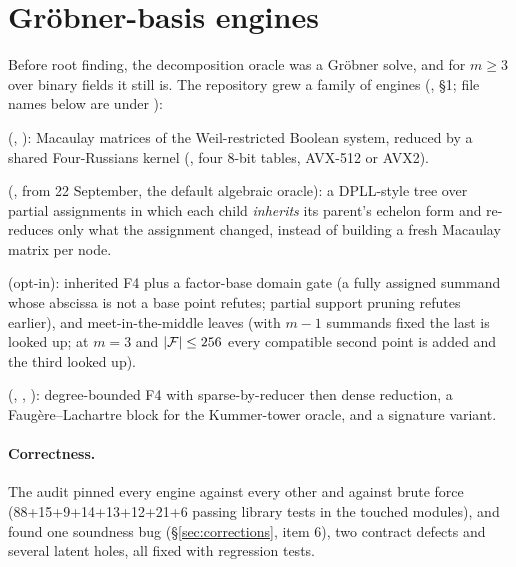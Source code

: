 \section{Gr\"obner-basis engines}\label{sec:groebner}

Before root finding, the decomposition oracle was a Gr\"obner solve, and
for $m\ge3$ over binary fields it still is. The repository grew a family
of engines (, \S1; file names below are under ):

\begin{description}[style=nextline, leftmargin=1.4em]
\item[Matrix F4 and F5 over $\FF_2$] (,
  ): Macaulay matrices of the Weil-restricted Boolean
  system, reduced by a shared Four-Russians kernel (, four
  8-bit tables, AVX-512 or AVX2).
\item[Inherited F4] (, from 22 September, the
  default algebraic oracle): a DPLL-style tree over partial assignments in
  which each child \emph{inherits} its parent's echelon form and re-reduces
  only what the assignment changed, instead of building a fresh Macaulay
  matrix per node.
\item[F6-IC] (opt-in): inherited F4 plus a factor-base domain gate (a
  fully assigned summand whose abscissa is not a base point refutes;
  partial support pruning refutes earlier), and meet-in-the-middle leaves
  (with $m-1$ summands fixed the last is looked up; at $m=3$ and
  $\lvert \mathcal{F} \rvert\le256$ every compatible second point is added and the third
  looked up).
\item[$\FF_p$ F4] (, ,
  ): degree-bounded F4 with sparse-by-reducer then
  dense reduction, a Faug\`ere--Lachartre block for the Kummer-tower
  oracle, and a signature variant.
\end{description}

\paragraph{Correctness.} The audit pinned every engine against every
other and against brute force (88+15+9+14+13+12+21+6 passing library
tests in the touched modules), and found one soundness bug
(\S\ref{sec:corrections}, item 6), two contract defects and several latent
holes, all fixed with regression tests.

